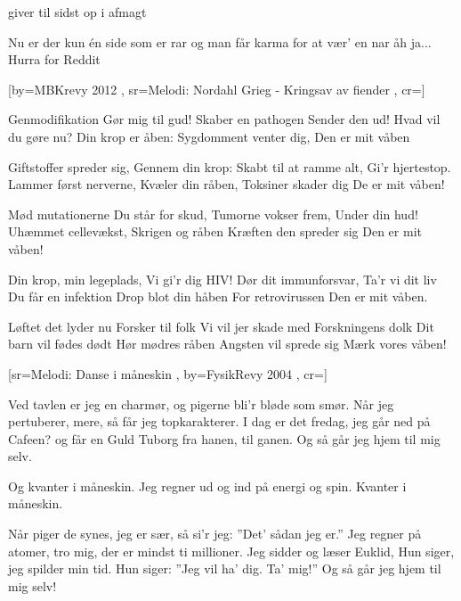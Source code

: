 \documentclass[pdftex,12pt]{article}
\begin{document}
\begin{songs}{}
\endverse
\beginverse
giver til sidst op i afmagt

\endverse
\beginverse
Nu er der kun én side som er rar
og man får karma for at vær' en nar
åh ja...
Hurra for Reddit

\endverse
\endsong



[by={MBKrevy 2012}
,
sr={Melodi: Nordahl Grieg - Kringsav av fiender}
,
cr={}]\hypertarget{Biologiske Våben}{}
\label{song47}

\beginverse
Genmodifikation
Gør mig til gud!
Skaber en pathogen
Sender den ud!
Hvad vil du gøre nu?
Din krop er åben:
Sygdomment venter dig,
Den er mit våben

\endverse
\beginverse
Giftstoffer spreder sig,
Gennem din krop:
Skabt til at ramme alt,
Gi'r hjertestop.
Lammer først nerverne,
Kvæler din råben,
Toksiner skader dig
De er mit våben!

\endverse
\beginverse
Mød mutationerne
Du står for skud,
Tumorne vokser frem,
Under din hud!
Uhæmmet cellevækst,
Skrigen og råben
Kræften den spreder sig
Den er mit våben!

\endverse
\beginverse
Din krop, min legeplads,
Vi gi'r dig HIV!
Dør dit immunforsvar,
Ta'r vi dit liv
Du får en infektion
Drop blot din håben
For retrovirussen
Den er mit våben.

\endverse
\beginverse
Løftet det lyder nu
Forsker til folk
Vi vil jer skade med
Forskningens dolk
Dit barn vil fødes dødt
Hør mødres råben
Angsten vil sprede sig
Mærk vores våben!

\endverse
\endsong



﻿[sr={Melodi: Danse i måneskin}
,
by={FysikRevy 2004}
,
cr={}]\hypertarget{Kvanter i måneskin}{}
\label{song48}

\beginverse
Ved tavlen er jeg en charmør,
og pigerne bli’r bløde som smør.
Når jeg pertuberer, mere,
så får jeg topkarakterer.
I dag er det fredag, jeg går
ned på Cafeen? og får
en Guld Tuborg fra hanen, til ganen.
Og så går jeg hjem til mig selv.

\endverse
\beginverse
Og kvanter i måneskin.
Jeg regner ud og ind
på energi og spin.
Kvanter i måneskin.

\endverse
\beginverse
Når piger de synes, jeg er sær,
så si’r jeg: ”Det’ sådan jeg er.”
Jeg regner på atomer, tro mig,
der er mindst ti millioner.
Jeg sidder og læser Euklid,
Hun siger, jeg spilder min tid.
Hun siger: ”Jeg vil ha’ dig. Ta’ mig!”
Og så går jeg hjem til mig selv!


\end{songs}
\end{document}
